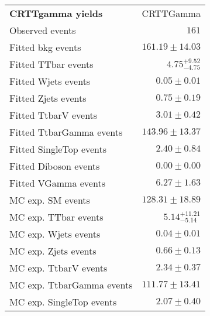 

\begin{table}
\begin{center}
\setlength{\tabcolsep}{0.0pc}
{\small
\begin{tabular*}{\textwidth}{@{\extracolsep{\fill}}lr}
\noalign{\smallskip}\hline\noalign{\smallskip}
{\bf CRTTgamma yields}           & CRTTGamma              \\[-0.05cm]
\noalign{\smallskip}\hline\noalign{\smallskip}
Observed events          & $161$                    \\
\noalign{\smallskip}\hline\noalign{\smallskip}
Fitted bkg events         & $161.19 \pm 14.03$              \\
\noalign{\smallskip}\hline\noalign{\smallskip}
        Fitted TTbar events         & $4.75_{-4.75}^{+9.52}$              \\
        Fitted Wjets events         & $0.05 \pm 0.01$              \\
        Fitted Zjets events         & $0.75 \pm 0.19$              \\
        Fitted TtbarV events         & $3.01 \pm 0.42$              \\
        Fitted TtbarGamma events         & $143.96 \pm 13.37$              \\
        Fitted SingleTop events         & $2.40 \pm 0.84$              \\
        Fitted Diboson events         & $0.00 \pm 0.00$              \\
        Fitted VGamma events         & $6.27 \pm 1.63$              \\
 \noalign{\smallskip}\hline\noalign{\smallskip}
MC exp. SM events              & $128.31 \pm 18.89$              \\
\noalign{\smallskip}\hline\noalign{\smallskip}
        MC exp. TTbar events         & $5.14_{-5.14}^{+11.21}$              \\
        MC exp. Wjets events         & $0.04 \pm 0.01$              \\
        MC exp. Zjets events         & $0.66 \pm 0.13$              \\
        MC exp. TtbarV events         & $2.34 \pm 0.37$              \\
        MC exp. TtbarGamma events         & $111.77 \pm 13.41$              \\
        MC exp. SingleTop events         & $2.07 \pm 0.40$              \\

\end{tabular*}}
\end{center}
\end{table}
